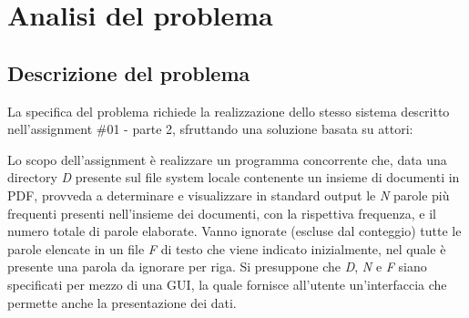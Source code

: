 \section{Analisi del problema}
\subsection{Descrizione del problema}
La specifica del problema richiede la realizzazione dello stesso sistema descritto nell'assignment \#01 - parte 2, sfruttando una soluzione basata su attori: \newline

\noindent Lo scopo dell'assignment è realizzare un programma concorrente che, data una directory \textit{D} presente sul file system locale contenente un insieme di documenti in PDF, provveda a determinare e visualizzare in standard output le \textit{N} parole più frequenti presenti nell’insieme dei documenti, con la rispettiva frequenza, e il numero totale di parole elaborate.\newline
Vanno ignorate (escluse dal conteggio) tutte le parole elencate in un file \textit{F} di testo che viene indicato inizialmente, nel quale è presente una parola da ignorare per riga.\newline
Si presuppone che \textit{D}, \textit{N} e \textit{F} siano specificati per mezzo di una GUI, la quale fornisce all'utente un'interfaccia che permette anche la presentazione dei dati.
